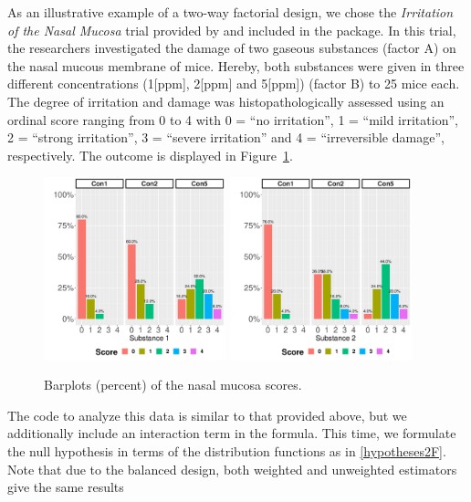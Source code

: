 As an illustrative example of a two-way factorial design, we chose the 
\textit{Irritation of the Nasal Mucosa} trial provided by 
\citet[Chapter~B.3.2]{brunner2019rank} and included in the package. In this trial, the researchers 
investigated the damage of two gaseous substances (factor A) on the nasal 
mucous membrane of mice. Hereby, both substances were given in three different 
concentrations (1[ppm], 2[ppm] and 5[ppm]) (factor B) to 25 mice each. The 
degree of irritation and damage was histopathologically assessed using an 
ordinal score ranging from 0 to 4 with 0 = ``no irritation'', 1 = ``mild 
irritation'', 2 = ``strong irritation'', 3 = ``severe irritation'' and 4 = 
``irreversible damage'', respectively. The outcome is displayed in Figure~\ref{fig:nms}.
\begin{figure}[t!]
	\centering
	\includegraphics[width=0.47\textwidth]{barplot_nms1}
		\includegraphics[width=0.47\textwidth]{barplot_nms2}
	\caption{\label{fig:nms} Barplots (percent) of the nasal mucosa scores.}
\end{figure}
The code to analyze this data is similar 
to that provided above, but we additionally include an interaction term in the 
formula. This time, we formulate the null hypothesis in terms of the 
distribution functions as in \eqref{hypotheses2F}. Note that due to the 
balanced design, both weighted and unweighted estimators give the same results 
